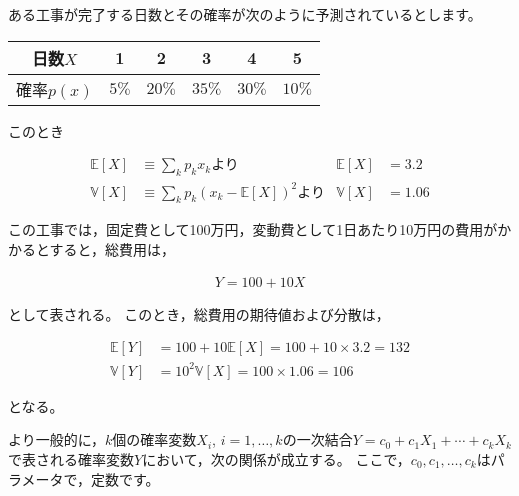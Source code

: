 \documentclass[
  letterpaper,
  pandoc,
  ja=standard,
  jafont = hiragino-pron]{ltjsbook}
\begin{document}
\begin{tcolorbox}[enhanced jigsaw, colframe=quarto-callout-tip-color-frame, breakable, rightrule=.15mm, coltitle=black, title=\textcolor{quarto-callout-tip-color}{\faLightbulb}\hspace{0.5em}{アフィン変換}, colbacktitle=quarto-callout-tip-color!10!white, leftrule=.75mm, colback=white, left=2mm, arc=.35mm, opacityback=0, titlerule=0mm, toptitle=1mm, bottomtitle=1mm, bottomrule=.15mm, toprule=.15mm, opacitybacktitle=0.6]

ある工事が完了する日数とその確率が次のように予測されているとします。

\begin{longtable}[]{@{}cccccc@{}}
\toprule\noalign{}
日数\(X\) & 1 & 2 & 3 & 4 & 5 \\
\midrule\noalign{}
\endhead
\bottomrule\noalign{}
\endlastfoot
確率\(p(x)\) & \(5\%\) & \(20\%\) & \(35\%\) & \(30\%\) & \(10\%\) \\
\end{longtable}

このとき

\[
\begin{aligned}
\mathbb{E}[X] &\equiv \sum _k p_k x_k \text{より} & \mathbb{E}[X] &= 3.2\\
\mathbb{V} [X] &\equiv \sum _k p_k (x_k - \mathbb{E}[X])^2 \text{より} & \mathbb{V} [X] &= 1.06
\end{aligned}
\]

この工事では，固定費として100万円，変動費として1日あたり10万円の費用がかかるとすると，総費用は，

\[
\begin{aligned}
Y = 100  + 10 X
\end{aligned}
\]

として表される。 このとき，総費用の期待値および分散は，

\[
\begin{aligned}
\mathbb{E}[Y] &= 100 + 10 \mathbb{E}[X] = 100 + 10 \times 3.2 = 132\\
\mathbb{V}[Y] &= 10^2 \mathbb{V}[X] = 100  \times 1.06 = 106
\end{aligned}
\]

となる。

\end{tcolorbox}

より一般的に，\(k\)個の確率変数\(X_i\),
\(i = 1, \dots ,k\)の一次結合\(Y = c_0 + c_1 X_1 + \cdots + c_k X_k\)で表される確率変数\(Y\)において，次の関係が成立する。
ここで，\(c_0,c_1, \dots, c_k\)はパラメータで，定数です。
\end{document}
